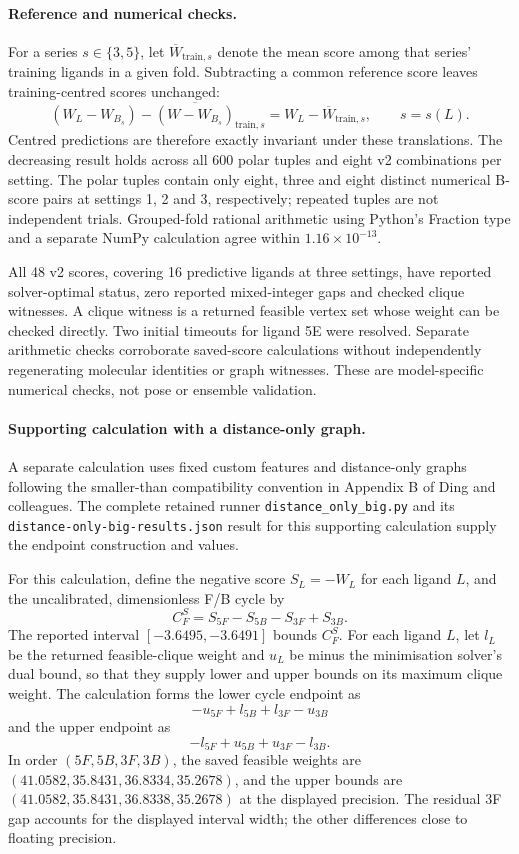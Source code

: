 \documentclass{article}
\begin{document}
\paragraph{Reference and numerical checks.}
For a series \(s\in\{3,5\}\), let \(\overline W_{\mathrm{train},s}\) denote the mean score among that series' training ligands in a given fold. Subtracting a common reference score leaves training-centred scores unchanged:
\[
 (W_L-W_{B_s})
 -\overline{(W-W_{B_s})}_{\mathrm{train},s}
 =W_L-\overline W_{\mathrm{train},s},
 \qquad s=s(L).
\]
Centred predictions are therefore exactly invariant under these translations. The decreasing result holds across all 600 polar tuples and eight v2 combinations per setting. The polar tuples contain only eight, three and eight distinct numerical B-score pairs at settings 1, 2 and 3, respectively; repeated tuples are not independent trials. Grouped-fold rational arithmetic using Python's Fraction type and a separate NumPy calculation agree within \(1.16\times10^{-13}\).

All 48 v2 scores, covering 16 predictive ligands at three settings, have reported solver-optimal status, zero reported mixed-integer gaps and checked clique witnesses. A clique witness is a returned feasible vertex set whose weight can be checked directly. Two initial timeouts for ligand 5E were resolved. Separate arithmetic checks corroborate saved-score calculations without independently regenerating molecular identities or graph witnesses. These are model-specific numerical checks, not pose or ensemble validation.

\paragraph{Supporting calculation with a distance-only graph.}
A separate calculation uses fixed custom features and distance-only graphs following the smaller-than compatibility convention in Appendix B of Ding and colleagues. The complete retained runner \texttt{distance\_only\_big.py} and its \texttt{distance-only-big-results.json} result for this supporting calculation supply the endpoint construction and values.

For this calculation, define the negative score \(S_L=-W_L\) for each ligand \(L\), and the uncalibrated, dimensionless F/B cycle by
\[
 C_F^S=S_{5F}-S_{5B}-S_{3F}+S_{3B}.
\]
The reported interval \([-3.6495,-3.6491]\) bounds \(C_F^S\). For each ligand \(L\), let \(l_L\) be the returned feasible-clique weight and \(u_L\) be minus the minimisation solver's dual bound, so that they supply lower and upper bounds on its maximum clique weight. The calculation forms the lower cycle endpoint as
\[
 -u_{5F}+l_{5B}+l_{3F}-u_{3B}
\]
and the upper endpoint as
\[
 -l_{5F}+u_{5B}+u_{3F}-l_{3B}.
\]
In order \((5F,5B,3F,3B)\), the saved feasible weights are \((41.0582,35.8431,36.8334,35.2678)\), and the upper bounds are \((41.0582,35.8431,36.8338,35.2678)\) at the displayed precision. The residual 3F gap accounts for the displayed interval width; the other differences close to floating precision.
\end{document}
